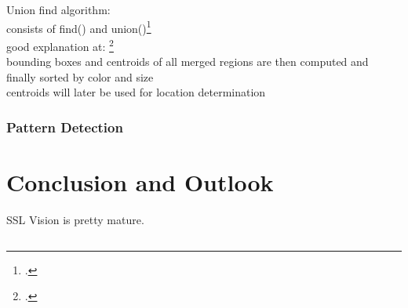 Union find algorithm:\\
consists of find() and union()\footcite[Cf.][]{sedgewick_union_find}\\
good explanation at:
\footcite[Cf.][]{wa_union_find} \\

bounding boxes and centroids of all merged regions are then computed and finally
sorted by color and size\\

centroids will later be used for location determination


\subsubsection{Pattern Detection}



\clearpage
\section{Conclusion and Outlook}
\label{sec:conclusion}
SSL Vision is pretty mature.




\newpage \begin{appendices} 
\appendixtocon %

\appendixpage %

\subsection*{\listappendixname}
\listofappendices

\newpage

\begin{subappendices}
\renewcommand{\setthesubsection}{\arabic{subsection}:}%

\label{apx:code-template}


\end{subappendices}
\end{appendices}

